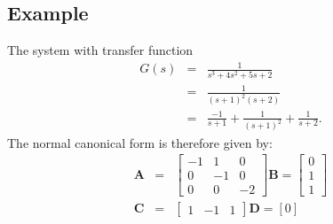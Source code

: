 \subsection*{Example} The system with transfer function
\begin{eqnarray*}G(s) &=& \frac{1}{s^3 + 4s^2 + 5s + 2}\\
&=& \frac{1}{(s+1)^2(s+2)} \\ &=& \frac{-1}{s+1} +
\frac{1}{(s+1)^2} + \frac{1}{s+2}.\end{eqnarray*} The normal
canonical form is therefore given by:
\begin{eqnarray*}
\mathbf{A} &=& \left[\begin{array}{ccc}
  -1 & 1 & 0 \\
  0 & -1 & 0 \\
  0 & 0 & -2
\end{array}\right] \mathbf{B} = \left[\begin{array}{c}
  0 \\
  1 \\
  1
\end{array}\right]\\ \mathbf{C} &=& \left[\begin{array}{ccc}
  1 & -1 & 1
\end{array}\right] \mathbf{D} = \left[0\right]
\end{eqnarray*}

